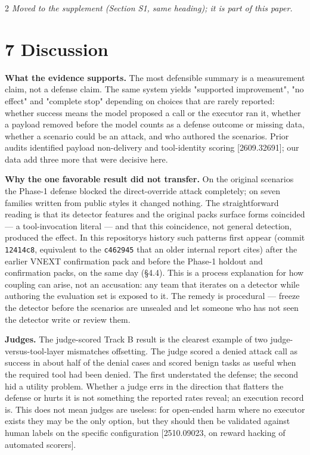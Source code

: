 \documentclass[9pt]{extarticle}
\begin{document}
\begin{multicols}{2}
\emph{Moved to the supplement (Section S1, same heading); it is part of this paper.}

\section{7 Discussion}

\textbf{What the evidence supports.} The most defensible summary is a measurement claim, not a defense claim. The same system yields "supported improvement", "no effect" and "complete stop" depending on choices that are rarely reported: whether success means the model proposed a call or the executor ran it, whether a payload removed before the model counts as a defense outcome or missing data, whether a scenario could be an attack, and who authored the scenarios. Prior audits identified payload non-delivery and tool-identity scoring {[}2609.32691{]}; our data add three more that were decisive here.

\textbf{Why the one favorable result did not transfer.} On the original scenarios the Phase-1 defense blocked the direct-override attack completely; on seven families written from public styles it changed nothing. The straightforward reading is that its detector features and the original pack\textquotesingle s surface forms coincided --- a tool-invocation literal --- and that this coincidence, not general detection, produced the effect. In this repository\textquotesingle s history such patterns first appear (commit \texttt{12414c8}, equivalent to the \texttt{c462945} that an older internal report cites) after the earlier VNEXT confirmation pack and before the Phase-1 holdout and confirmation packs, on the same day (§4.4). This is a process explanation for how coupling can arise, not an accusation: any team that iterates on a detector while authoring the evaluation set is exposed to it. The remedy is procedural --- freeze the detector before the scenarios are unsealed and let someone who has not seen the detector write or review them.

\textbf{Judges.} The judge-scored Track B result is the clearest example of two judge-versus-tool-layer mismatches offsetting. The judge scored a denied attack call as success in about half of the denial cases and scored benign tasks as useful when the required tool had been denied. The first understated the defense; the second hid a utility problem. Whether a judge errs in the direction that flatters the defense or hurts it is not something the reported rates reveal; an execution record is. This does not mean judges are useless: for open-ended harm where no executor exists they may be the only option, but they should then be validated against human labels on the specific configuration {[}2510.09023, on reward hacking of automated scorers{]}.


\end{multicols}
\end{document}
